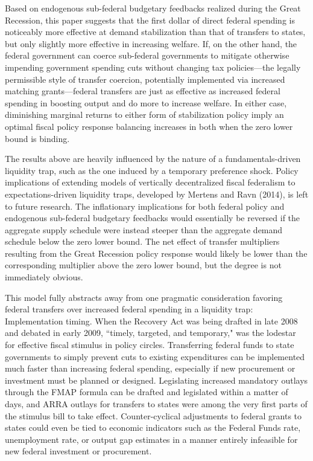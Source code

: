 \documentclass[12pt,letterpaper]{article}
\begin{document}
Based on endogenous sub-federal budgetary feedbacks realized during the Great Recession, this paper suggests that the first dollar of direct federal spending is noticeably more effective at demand stabilization than that of transfers to states, but only slightly more effective in increasing welfare. If, on the other hand, the federal government can coerce sub-federal governments to mitigate otherwise impending government spending cuts without changing tax policies---the legally permissible style of transfer coercion, potentially implemented via increased matching grants---federal transfers are just as effective as increased federal spending in boosting output and do more to increase welfare. In either case, diminishing marginal returns to either form of stabilization policy imply an optimal fiscal policy response balancing increases in both when the zero lower bound is binding.

The results above are heavily influenced by the nature of a fundamentals-driven liquidity trap, such as the one induced by a temporary preference shock. Policy implications of extending models of vertically decentralized fiscal federalism to expectations-driven liquidity traps, developed by Mertens and Ravn (2014), is left to future research. The inflationary implications for both federal policy and endogenous sub-federal budgetary feedbacks would essentially be reversed if the aggregate supply schedule were instead steeper than the aggregate demand schedule below the zero lower bound. The net effect of transfer multipliers resulting from the Great Recession policy response would likely be lower than the corresponding multiplier above the zero lower bound, but the degree is not immediately obvious. 

This model fully abstracts away from one pragmatic consideration favoring federal transfers over increased federal spending in a liquidity trap: Implementation timing. When the Recovery Act was being drafted in late 2008 and debated in early 2009, ``timely, targeted, and temporary," was the lodestar for effective fiscal stimulus in policy circles. Transferring federal funds to state governments to simply prevent cuts to existing expenditures can be implemented much faster than increasing federal spending, especially if new procurement or investment must be planned or designed. Legislating increased mandatory outlays through the FMAP formula can be drafted and legislated within a matter of days, and ARRA outlays for transfers to states were among the very first parts of the stimulus bill to take effect. Counter-cyclical adjustments to federal grants to states could even be tied to economic indicators such as the Federal Funds rate, unemployment rate, or output gap estimates in a manner entirely infeasible for new federal investment or procurement. 
\end{document}
